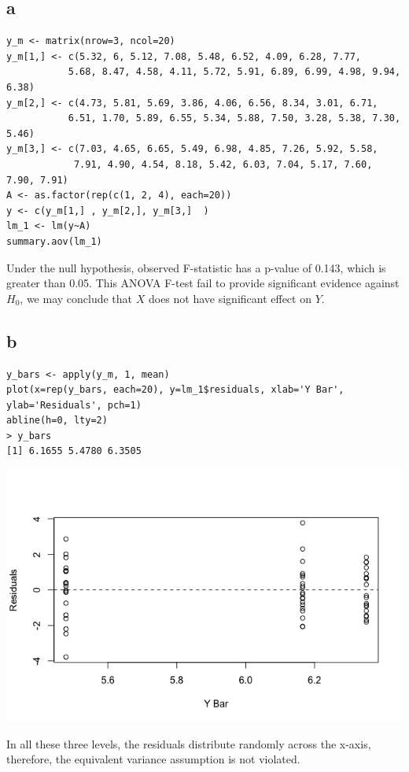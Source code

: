 \documentclass[11pt,letterpaper]{article}
\begin{document}
\subsection*{a}
\begin{verbatim}
y_m <- matrix(nrow=3, ncol=20)
y_m[1,] <- c(5.32, 6, 5.12, 7.08, 5.48, 6.52, 4.09, 6.28, 7.77, 
           5.68, 8.47, 4.58, 4.11, 5.72, 5.91, 6.89, 6.99, 4.98, 9.94, 6.38)
y_m[2,] <- c(4.73, 5.81, 5.69, 3.86, 4.06, 6.56, 8.34, 3.01, 6.71, 
           6.51, 1.70, 5.89, 6.55, 5.34, 5.88, 7.50, 3.28, 5.38, 7.30, 5.46)
y_m[3,] <- c(7.03, 4.65, 6.65, 5.49, 6.98, 4.85, 7.26, 5.92, 5.58,
            7.91, 4.90, 4.54, 8.18, 5.42, 6.03, 7.04, 5.17, 7.60, 7.90, 7.91)
A <- as.factor(rep(c(1, 2, 4), each=20))
y <- c(y_m[1,] , y_m[2,], y_m[3,]  )
lm_1 <- lm(y~A)
summary.aov(lm_1)
\end{verbatim}
\noindent Under the null hypothesis, observed F-statistic has a p-value of 0.143, which is greater than 0.05. This ANOVA F-test fail to provide significant evidence against $H_0$, we may conclude that $X$ does not have significant effect on $Y$.

\subsection*{b}
\begin{verbatim}
y_bars <- apply(y_m, 1, mean)
plot(x=rep(y_bars, each=20), y=lm_1$residuals, xlab='Y Bar', ylab='Residuals', pch=1)
abline(h=0, lty=2)
> y_bars
[1] 6.1655 5.4780 6.3505
\end{verbatim}
\includegraphics[scale=0.5]{lect-7-4-b.png}

\noindent In all these three levels, the residuals distribute randomly across the x-axis, therefore, the equivalent variance assumption is not violated. 
\end{document}
